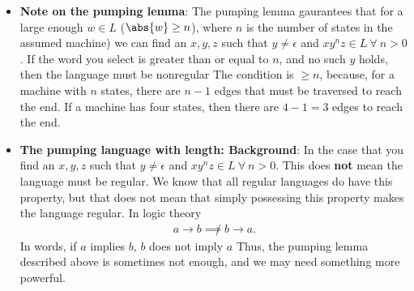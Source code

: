 \documentclass{report}
\begin{document}
\begin{itemize}
\begin{enumerate}
    \end{enumerate}
\item \textbf{Note on the pumping lemma}: The pumping lemma gaurantees that for a large enough $w\in L$ ($\abs{w} \geq n$), where $n$ is the number of states in the assumed machine) we can find an $x,y,z$ such that $y\ne \epsilon$ and $xy^{n}z \in L\ \forall\ n > 0$. If the word you select is greater than or equal to $n$, and no such $y$ holds, then the language must be nonregular
    \bigbreak \noindent 
    The condition is $ \geq n$, because, for a machine with $n$ states, there are $n-1$ edges that must be traversed to reach the end. If a machine has four states, then there are $4-1 = 3$ edges to reach the end.
\item \textbf{The pumping language with length: Background}: In the case that you find an $x,y,z$ such that $y \ne \epsilon$ and $xy^{n}z \in L\ \forall\ n> 0$. This does \textbf{not} mean the language must be regular. We know that all regular languages do have this property, but that does not mean that simply possessing this property makes the language regular. In logic theory
    \begin{align*}
        a \rightarrow b 
        \not\implies b\rightarrow a
    .\end{align*}
    In words, if $a$ implies $b$, $b$ does not imply $a$
    \bigbreak \noindent 
    Thus, the pumping lemma described above is sometimes not enough, and we may need something more powerful.


\end{itemize}
\end{document}
